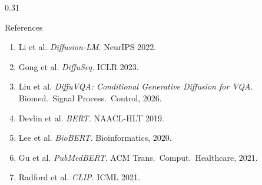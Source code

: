 \documentclass[final]{beamer}
\newcommand{\postersection}[2]{%
  \begin{block}{\LARGE #1}
    \justifying\large #2
  \end{block}
}
\begin{document}
\begin{frame}[t, fragile]
\begin{columns}[t]
\begin{column}{0.31\linewidth}
  \vspace{0.1cm}

  \postersection{References}{%
    {\normalsize
    \begin{enumerate}
      \item Li et al. \textit{Diffusion-LM.} NeurIPS 2022.
      \item Gong et al. \textit{DiffuSeq.} ICLR 2023.
      \item Liu et al. \textit{DiffuVQA: Conditional Generative Diffusion for VQA.} Biomed.\ Signal Process.\ Control, 2026.
      \item Devlin et al. \textit{BERT.} NAACL-HLT 2019.
      \item Lee et al. \textit{BioBERT.} Bioinformatics, 2020.
      \item Gu et al. \textit{PubMedBERT.} ACM Trans.\ Comput.\ Healthcare, 2021.
      \item Radford et al. \textit{CLIP.} ICML 2021.
    \end{enumerate}
    }
  }

\end{column}
\end{columns}


\end{frame}
\end{document}
